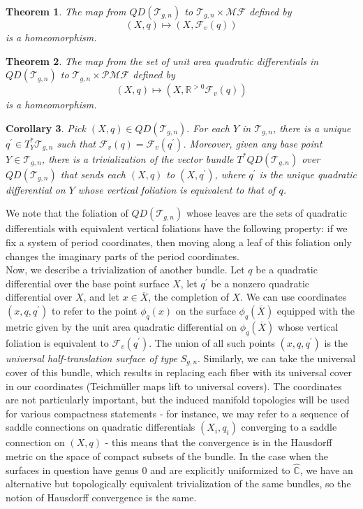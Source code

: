 \documentclass[12pt]{article}
\newtheorem{theorem}{Theorem}[section]
\newtheorem{corollary}[theorem]{Corollary}
\newcommand{\rr}{\mathbb{R}}
\newcommand{\cc}{\mathbb{C}}
\begin{document}
\begin{theorem}\cite{HM} The map from $QD(\mathcal{T}_{g,n})$ to $\mathcal{T}_{g,n} \times \mathcal{MF}$ defined by $$(X,q) \mapsto (X,\mathcal{F}_v(q))$$ is a homeomorphism.\end{theorem}

\begin{theorem}\cite{HM} The map from the set of unit area quadratic differentials in $QD(\mathcal{T}_{g,n})$ to $\mathcal{T}_{g,n} \times \mathcal{PMF}$ defined by $$(X,q) \mapsto (X,\rr^{>0}\mathcal{F}_v(q))$$ is a homeomorphism.\end{theorem}

\begin{corollary} \cite{HM} Pick $(X,q) \in QD(\mathcal{T}_{g,n}).$ For each $Y$ in $\mathcal{T}_{g,n}$, there is a unique $q^\prime \in T_Y^*\mathcal{T}_{g,n}$ such that $\mathcal{F}_v(q) = \mathcal{F}_v(q^\prime)$. Moreover, given any base point $Y \in \mathcal{T}_{g,n}$, there is a trivialization of the vector bundle $T^*QD(\mathcal{T}_{g,n})$ over $QD(\mathcal{T}_{g,n})$ that sends each $(X,q)$ to $(X,q^\prime)$, where $q^\prime$ is the unique quadratic differential on $Y$ whose vertical foliation is equivalent to that of $q$. \end{corollary}

\noindent We note that the foliation of $QD(\mathcal{T}_{g,n})$ whose leaves are the sets of quadratic differentials with equivalent vertical foliations have the following property: if we fix a system of period coordinates, then moving along a leaf of this foliation only changes the imaginary parts of the period coordinates.\\

\noindent Now, we describe a trivialization of another bundle. Let $q$ be a quadratic differential over the base point surface $X$, let $q^\prime$ be a nonzero quadratic differential over $X$, and let $x \in \overline{X}$, the completion of $X$. We can use coordinates $(x,q,q^\prime)$ to refer to the point $\phi_q(x)$ on the surface $\phi_q(\overline{X})$ equipped with the metric given by the unit area quadratic differential on $\phi_q(\overline{X})$ whose vertical foliation is equivalent to $\mathcal{F}_v(q^\prime)$. The union of all such points $(x,q,q^\prime)$ is the \emph{universal half-translation surface of type} $S_{g,n}$. Similarly, we can take the universal cover of this bundle, which results in replacing each fiber with its universal cover in our coordinates (Teichm\"uller maps lift to universal covers). The coordinates are not particularly important, but the induced manifold topologies will be used for various compactness statements - for instance, we may refer to a sequence of saddle connections on quadratic differentials $(X_i,q_i)$ converging to a saddle connection on $(X,q)$ - this means that the convergence is in the Hausdorff metric on the space of compact subsets of the bundle. In the case when the surfaces in question have genus $0$ and are explicitly uniformized to $\hat{\cc}$, we have an alternative but topologically equivalent trivialization of the same bundles, so the notion of Hausdorff convergence is the same.
\end{document}
